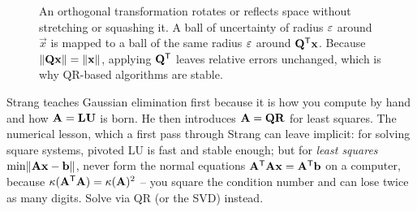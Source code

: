 \begin{figure}[H]
\caption{An orthogonal transformation rotates or reflects space without stretching or
squashing it. A ball of uncertainty of radius $\varepsilon$ around $\vec{x}$ is mapped to a
ball of the same radius $\varepsilon$ around $\mathbf{Q}^{\mathsf{T}}\mathbf{x}$. Because
$\lVert\mathbf{Q}\mathbf{x}\rVert=\lVert\mathbf{x}\rVert$, applying $\mathbf{Q}^{\mathsf{T}}$ leaves relative errors
unchanged, which is why QR-based algorithms are stable.}
\label{ch33:orthogonal}
\end{figure}

\begin{strangbox}
Strang teaches Gaussian elimination first because it is how you compute by hand and how
$\mathbf{A}=\mathbf{L}\mathbf{U}$ is born. He then introduces $\mathbf{A}=\mathbf{Q}\mathbf{R}$ for
least squares. The numerical lesson, which a first pass through Strang can leave
implicit: for solving square systems, pivoted LU is fast and stable enough; but for
\emph{least squares} $\min\lVert\mathbf{A}\mathbf{x}-\mathbf{b}\rVert$, never form the normal
equations $\mathbf{A}^{\mathsf{T}}\mathbf{A}\mathbf{x}=\mathbf{A}^{\mathsf{T}}\mathbf{b}$ on a computer, because
$\kappa(\mathbf{A}^{\mathsf{T}}\mathbf{A}) = \kappa(\mathbf{A})^2$ -- you square the condition number and
can lose twice as many digits. Solve via QR (or the SVD) instead.
\end{strangbox}

